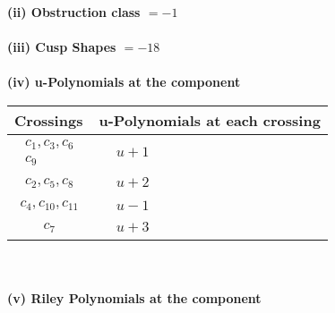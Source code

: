 \documentclass[1p]{elsarticle_modified}
\theoremstyle{definition}
\begin{document}
\flushleft \textbf{(ii) Obstruction class $= -1$}\\~\\
\flushleft \textbf{(iii) Cusp Shapes $= -18$}\\~\\
\newpage\renewcommand{\arraystretch}{1}
\flushleft \textbf{(iv) u-Polynomials at the component}\newline \\
\begin{tabular}{m{50pt}|m{274pt}}
Crossings & \hspace{64pt}u-Polynomials at each crossing \\
\hline $$\begin{aligned}c_{1},c_{3},c_{6}\\c_{9}\end{aligned}$$&$\begin{aligned}
&u+1
\end{aligned}$\\
\hline $$\begin{aligned}c_{2},c_{5},c_{8}\end{aligned}$$&$\begin{aligned}
&u+2
\end{aligned}$\\
\hline $$\begin{aligned}c_{4},c_{10},c_{11}\end{aligned}$$&$\begin{aligned}
&u-1
\end{aligned}$\\
\hline $$\begin{aligned}c_{7}\end{aligned}$$&$\begin{aligned}
&u+3
\end{aligned}$\\
\hline
\end{tabular}\\~\\
\newpage\renewcommand{\arraystretch}{1}
\flushleft \textbf{(v) Riley Polynomials at the component}\newline \\
\end{document}
